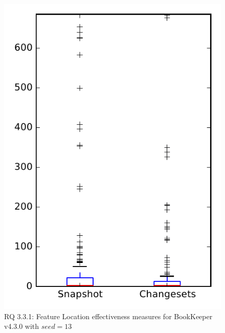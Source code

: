 
\begin{figure}
\centering
\includegraphics[height=0.4\textheight]{figures/flt_seed/rq1_bookkeeper_13}
\caption{RQ 3.3.1: Feature Location effectiveness measures for BookKeeper v4.3.0 with $seed=13$}
\label{fig:flt_seed:rq1:bookkeeper}
\end{figure}
